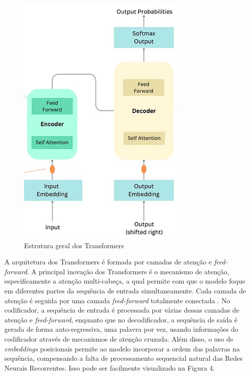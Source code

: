 \documentclass[conference]{IEEEtran}
\begin{document}
\begin{figure}[h!]
    \centering
    \includegraphics[width=\linewidth]{transformer.png}
    \caption{Estrutura geral dos Transformers}
    \label{fig:exemplo3}
\end{figure}

A arquitetura dos Transformers é formada por camadas de atenção e \textit{feed-forward}. A principal inovação dos Transformers é o mecanismo de atenção, especificamente a atenção multi-cabeça, a qual permite com que o modelo foque em diferentes partes da sequência de entrada simultaneamente. Cada camada de atenção é seguida por uma camada \textit{feed-forward} totalmente conectada \cite{trastru}. No codificador, a sequência de entrada é processada por várias dessas camadas de atenção e \textit{feed-forward}, enquanto que no decodificador, a sequência de saída é gerada de forma auto-regressiva, uma palavra por vez, usando informações do codificador através de mecanismos de atenção cruzada. Além disso, o uso de \textit{embeddings} posicionais permite ao modelo incorporar a ordem das palavras na sequência, compensando a falta de processamento sequencial natural das Redes Neurais Recorrentes\cite{tra}. Isso pode ser facilmente visualizado na Figura 4.
\end{document}
